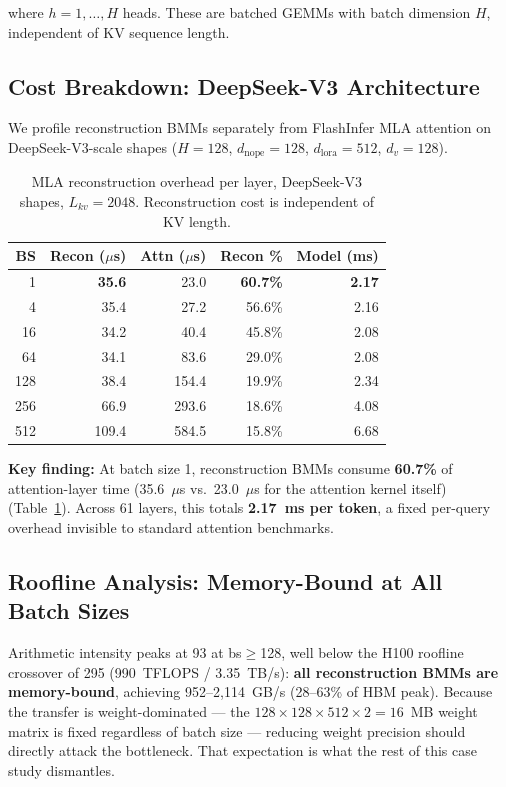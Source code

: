 \documentclass[10pt,twocolumn]{article}
\begin{document}
where $h = 1, \ldots, H$ heads.  These are batched GEMMs with batch dimension $H$, independent of KV sequence length.

\subsection{Cost Breakdown: DeepSeek-V3 Architecture}

We profile reconstruction BMMs separately from FlashInfer MLA attention on DeepSeek-V3-scale shapes ($H=128$, $d_\text{nope}=128$, $d_\text{lora}=512$, $d_v=128$).

\begin{table}[h]
\centering
\small
\caption{MLA reconstruction overhead per layer, DeepSeek-V3 shapes, $L_{kv}=2048$.  Reconstruction cost is independent of KV length.}
\label{tab:recon}
\begin{tabular}{@{}rrrrr@{}}
\toprule
BS & Recon ($\mu$s) & Attn ($\mu$s) & Recon \% & Model (ms) \\
\midrule
  1 & \textbf{35.6} &  23.0 & \textbf{60.7\%} & \textbf{2.17} \\
  4 & 35.4 &  27.2 & 56.6\% & 2.16 \\
 16 & 34.2 &  40.4 & 45.8\% & 2.08 \\
 64 & 34.1 &  83.6 & 29.0\% & 2.08 \\
128 & 38.4 & 154.4 & 19.9\% & 2.34 \\
256 & 66.9 & 293.6 & 18.6\% & 4.08 \\
512 & 109.4 & 584.5 & 15.8\% & 6.68 \\
\bottomrule
\end{tabular}
\end{table}

\textbf{Key finding:}  At batch size 1, reconstruction BMMs consume \textbf{60.7\%} of attention-layer time (35.6~$\mu$s vs.\ 23.0~$\mu$s for the attention kernel itself) (Table~\ref{tab:recon}).  Across 61 layers, this totals \textbf{2.17~ms per token}, a fixed per-query overhead invisible to standard attention benchmarks.

\subsection{Roofline Analysis: Memory-Bound at All Batch Sizes}

Arithmetic intensity peaks at 93 at bs$\geq$128, well below the H100 roofline crossover of 295 (990~TFLOPS / 3.35~TB/s): \textbf{all reconstruction BMMs are memory-bound}, achieving 952--2{,}114~GB/s (28--63\% of HBM peak).  Because the transfer is weight-dominated --- the $128\times128\times512\times2 = 16$~MB weight matrix is fixed regardless of batch size --- reducing weight precision should directly attack the bottleneck.  That expectation is what the rest of this case study dismantles.
\end{document}
